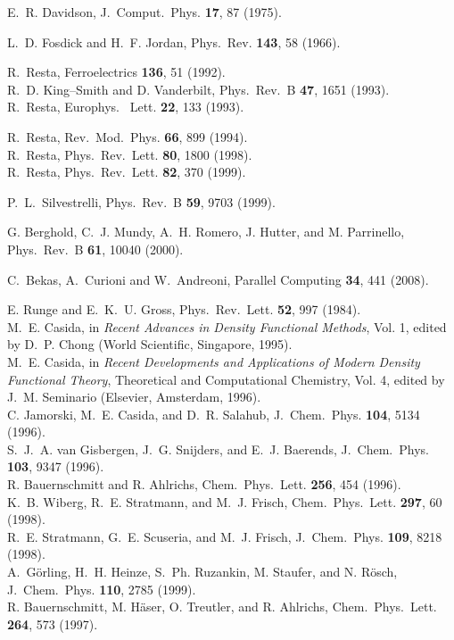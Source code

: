 \documentclass[twoside,10pt,titlepage,a4paper]{article}
\begin{document}
\begin{thebibliography}{999}
 E.~R. Davidson,
     J.~Comput.~Phys. {\bf 17}, 87 (1975).

    L.~D. Fosdick and H.~F. Jordan,
    Phys.~Rev. {\bf 143}, 58 (1966).

     R.~Resta, Ferroelectrics {\bf 136}, 51 (1992). \\
     R.~D. King--Smith and D. Vanderbilt, Phys.~Rev.~B {\bf 47}, 1651 (1993). \\
     R.~Resta, Europhys.~ Lett. {\bf 22}, 133 (1993).

     R.~Resta, Rev.~Mod.~Phys. {\bf 66}, 899 (1994). \\
     R.~Resta, Phys.~Rev.~Lett. {\bf 80}, 1800 (1998). \\
     R.~Resta, Phys.~Rev.~Lett. {\bf 82}, 370 (1999).

    P.~L.~Silvestrelli, Phys.~Rev.~B {\bf 59}, 9703 (1999).

 G. Berghold, C.~J. Mundy, A.~H. Romero, J. Hutter, and M. Parrinello,
      Phys.~Rev.~B {\bf 61}, 10040 (2000).

    C.~Bekas, A.~Curioni and W.~Andreoni,
    Parallel Computing {\bf 34}, 441 (2008). 

     E. Runge and E.~K.~U. Gross, Phys.~Rev.~Lett. {\bf 52}, 997 (1984). \\
     M.~E. Casida, in {\em Recent Advances in Density Functional Methods}, Vol. 1,
     edited by D.~P. Chong (World Scientific, Singapore, 1995). \\
     M.~E. Casida, in {\em Recent Developments and Applications of Modern
     Density Functional Theory}, Theoretical and Computational Chemistry, Vol. 4,
     edited by J.~M. Seminario (Elsevier, Amsterdam, 1996). \\
     C. Jamorski, M.~E. Casida, and D.~R. Salahub, J.~Chem.~Phys. {\bf 104}, 5134 (1996). \\
     S.~J.~A. van Gisbergen, J.~G. Snijders, and E.~J. Baerends, J.~Chem.~Phys. {\bf 103}, 9347 (1996). \\
     R. Bauernschmitt and R. Ahlrichs, Chem.~Phys.~Lett. {\bf 256}, 454 (1996). \\
     K.~B. Wiberg, R.~E. Stratmann, and M.~J. Frisch, Chem.~Phys.~Lett. {\bf 297}, 60 (1998). \\
     R.~E. Stratmann, G.~E. Scuseria, and M.~J. Frisch, J.~Chem.~Phys. {\bf 109}, 8218 (1998). \\
     A.~G\"orling, H.~H. Heinze, S.~Ph. Ruzankin, M. Staufer, and N. R\"osch,
     J.~Chem.~Phys. {\bf 110}, 2785 (1999). \\
     R. Bauernschmitt, M. H\"aser, O. Treutler, and R. Ahlrichs, Chem.~Phys.~Lett. {\bf 264}, 573 (1997).


\end{thebibliography}
\end{document}
